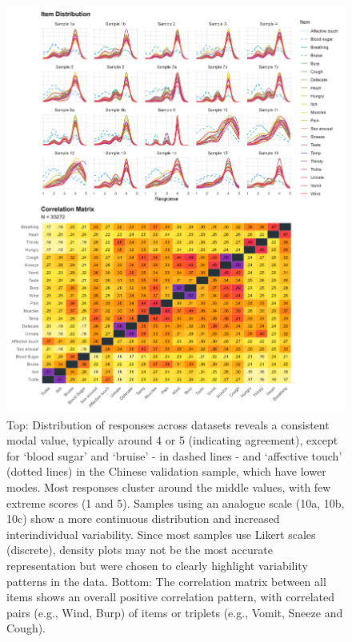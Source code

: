 \documentclass[
  jou,
  floatsintext,
  longtable,
  nolmodern,
  notxfonts,
  notimes,
  colorlinks=true,linkcolor=blue,citecolor=blue,urlcolor=blue]{apa7}
\begin{document}
\begin{figure}[!htbp]

{\caption{{Top: Distribution of responses across datasets reveals a
consistent modal value, typically around 4 or 5 (indicating agreement),
except for `blood sugar' and `bruise' - in dashed lines - and `affective
touch' (dotted lines) in the Chinese validation sample, which have lower
modes. Most responses cluster around the middle values, with few extreme
scores (1 and 5). Samples using an analogue scale (10a, 10b, 10c) show a
more continuous distribution and increased interindividual variability.
Since most samples use Likert scales (discrete), density plots may not
be the most accurate representation but were chosen to clearly highlight
variability patterns in the data. Bottom: The correlation matrix between
all items shows an overall positive correlation pattern, with correlated
pairs (e.g., Wind, Burp) of items or triplets (e.g., Vomit, Sneeze and
Cough).}{\label{fig-distributions}}}}

\includegraphics[width=1\linewidth,height=\textheight,keepaspectratio]{../../analysis/figures/Figure1.png}

\end{figure}
\end{document}
